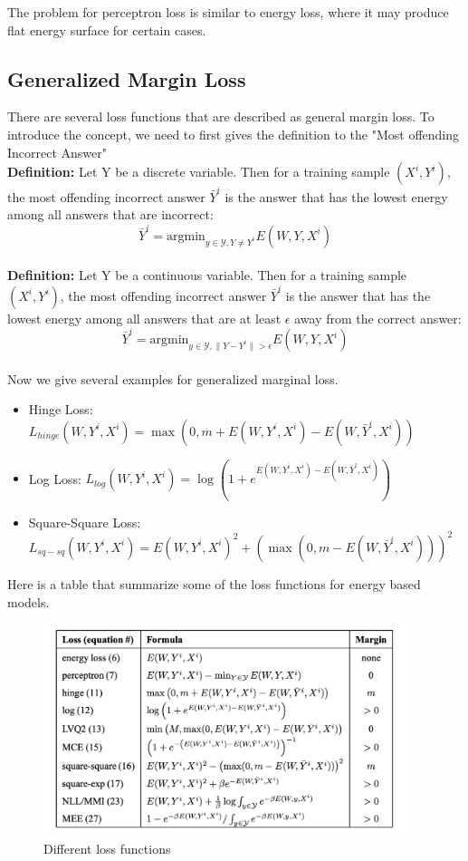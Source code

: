 The problem for perceptron loss is similar to energy loss,
where it may produce flat energy surface for certain cases.

\subsection{Generalized Margin Loss}

There are several loss functions that are described as general margin loss.
To introduce the concept, we need to first gives the definition 
to the "Most offending Incorrect Answer"\\

\textbf{Definition: } Let Y be a discrete variable. Then for a training sample $(X^i, Y^i)$,
the most offending incorrect answer $\bar{Y}^i$
is the answer that has the lowest energy among all answers that are incorrect:
\[
    \bar{Y}^i = \text{argmin}_{y \in \mathcal{Y}, Y \neq Y^i}
    E(W, Y, X^i)
\]
\\
\textbf{Definition: } Let Y be a continuous variable. 
Then for a training sample $(X^i, Y^i)$,
the most offending incorrect answer $\bar{Y}^i$
is the answer that has the lowest energy among all answers
that are at least $\epsilon$ away from the correct answer:
\[
    \bar{Y}^i = \text{argmin}_{y \in \mathcal{Y}, \parallel	Y-Y^i\parallel > \epsilon}
    E(W, Y, X^i)
\]
\\
Now we give several examples for generalized marginal loss.
\begin{itemize}
    \item Hinge Loss: 
    $L_{hinge}(W, Y^i, X^i) = \max(0, m + E(W, Y^i, X^i) - E(W, \bar{Y}^i, X^i))$
    \item Log Loss:
    $L_{log}(W, Y^i, X^i) = \log(1 + e^{E(W, Y^i, X^i) - E(W, \bar{Y}^i, X^i)})$
    \item Square-Square Loss:
    $L_{sq-sq}(W, Y^i, X^i) = E(W, Y^i, X^i)^2 + (\max(0, m - E(W, \bar{Y}^i, X^i)))^2$

\end{itemize}

Here is a table that summarize some of the loss functions for energy based models.
\begin{figure}[h]
    \centering
    \includegraphics[width=300pt]{lectures/08-a/images/loss_zoo.png}
    \caption{Different loss functions}
    \label{fig:energy_based_models_loss_functions}
\end{figure}


